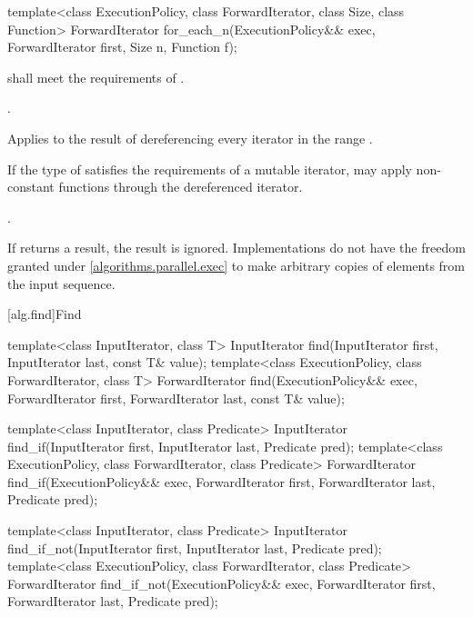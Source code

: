 %
\begin{itemdecl}
template<class ExecutionPolicy, class ForwardIterator, class Size, class Function>
  ForwardIterator for_each_n(ExecutionPolicy&& exec, ForwardIterator first, Size n,
                             Function f);
\end{itemdecl}

\begin{itemdescr}
\pnum
\requires
{} shall meet the requirements of .

\pnum
\requires
{}.

\pnum
\effects
Applies  to the result of dereferencing every iterator in the range
.
\begin{note}
If the type of  satisfies the requirements of a mutable iterator,
 may apply non-constant functions through the dereferenced iterator.
\end{note}

\pnum
\returns
{}.

\pnum
\remarks
If  returns a result, the result is ignored.  Implementations do not
have the freedom granted under \ref{algorithms.parallel.exec} to make arbitrary
copies of elements from the input sequence.
\end{itemdescr}


[alg.find]{Find}

%
%
%
\begin{itemdecl}
template<class InputIterator, class T>
  InputIterator find(InputIterator first, InputIterator last,
                     const T& value);
template<class ExecutionPolicy, class ForwardIterator, class T>
  ForwardIterator find(ExecutionPolicy&& exec, ForwardIterator first, ForwardIterator last,
                       const T& value);

template<class InputIterator, class Predicate>
  InputIterator find_if(InputIterator first, InputIterator last,
                        Predicate pred);
template<class ExecutionPolicy, class ForwardIterator, class Predicate>
  ForwardIterator find_if(ExecutionPolicy&& exec, ForwardIterator first, ForwardIterator last,
                          Predicate pred);

template<class InputIterator, class Predicate>
  InputIterator find_if_not(InputIterator first, InputIterator last,
                            Predicate pred);
template<class ExecutionPolicy, class ForwardIterator, class Predicate>
  ForwardIterator find_if_not(ExecutionPolicy&& exec, ForwardIterator first, ForwardIterator last,
                              Predicate pred);
\end{itemdecl}

